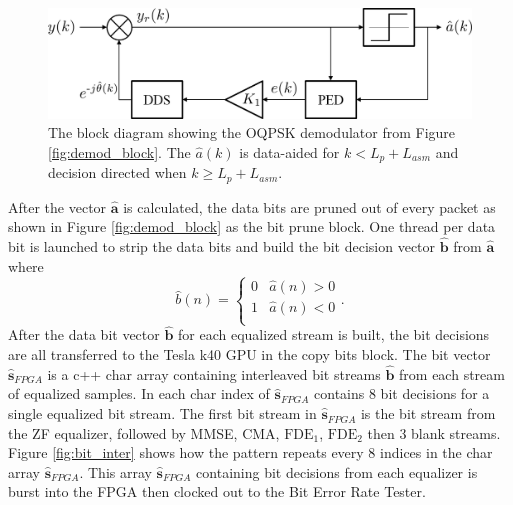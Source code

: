 \begin{figure}
	\centering\includegraphics[width=\textwidth/10*8]{figures/gpu/demod_loop.png}
	\caption{The block diagram showing the OQPSK demodulator from Figure \ref{fig:demod_block}. The $\hat{a}(k)$ is data-aided for $k<L_p+L_{asm}$ and decision directed when $k\geq L_p+L_{asm}$.}
	\label{fig:demod_loop}
\end{figure}

After the vector $\hat{\mathbf{a}}$ is calculated, the data bits are pruned out of every packet as shown in Figure \ref{fig:demod_block} as the bit prune block.
One thread per data bit is launched to strip the data bits and build the bit decision vector $\hat{\mathbf{b}}$ from $\hat{\mathbf{a}}$ where
\begin{equation}
\hat{b}(n)
= 
\begin{cases}
0 &\hat{a}(n)>0 \\
1 &\hat{a}(n)<0\\
\end{cases}.
\end{equation}
After the data bit vector $\hat{\mathbf{b}}$ for each equalized stream is built, the bit decisions are all transferred to the Tesla k40 GPU in the copy bits block.
The bit vector $\hat{\mathbf{s}}_{FPGA}$ is a c++ char array containing interleaved bit streams $\hat{\mathbf{b}}$ from each stream of equalized samples. 
In each char index of $\hat{\mathbf{s}}_{FPGA}$ contains 8 bit decisions for a single equalized bit stream.
The first bit stream in $\hat{\mathbf{s}}_{FPGA}$ is the bit stream from the ZF equalizer, followed by MMSE, CMA, $\text{FDE}_1$, $\text{FDE}_2$ then 3 blank streams.
Figure \ref{fig:bit_inter} shows how the pattern repeats every 8 indices in the char array $\hat{\mathbf{s}}_{FPGA}$.
This array $\hat{\mathbf{s}}_{FPGA}$ containing bit decisions from each equalizer is burst into the FPGA then clocked out to the Bit Error Rate Tester.
